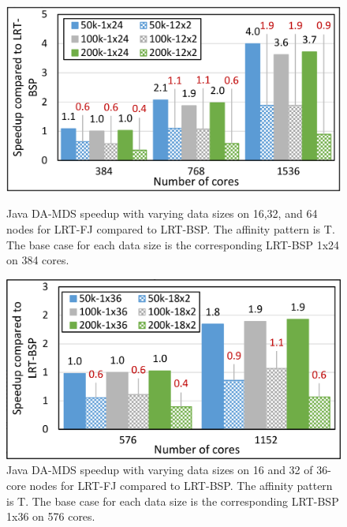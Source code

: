 \documentclass[10pt, conference, compsocconf]{IEEEtran}
\begin{document}
\begin{figure}[!htb]
	\begin{minipage}{0.49\textwidth}
        \centering
        \includegraphics[width=1\columnwidth]{images/fig_damds_LRT_FJ_speedup_compared_to_LRT_BPS_binding_pattern_T}
\caption{Java DA-MDS speedup with varying data sizes on 16,32, and 64 nodes for \ac{LRT-FJ} compared to \ac{LRT-BSP}. The affinity pattern is T. The base case for each data size is the corresponding \ac{LRT-BSP} 1x24 on 384 cores.}
\label{fig:fig_damds_LRT_FJ_speedup_compared_to_LRT_BPS_binding_pattern_T}
    \end{minipage}
    \hspace{1.4mm}
    \begin{minipage}{0.49\textwidth}
        \centering
        \includegraphics[width=1\columnwidth]{images/fig_damds_LRT_FJ_speedup_on_36core_nodes_compared_to_LRT_BPS_binding_pattern_T}
        \caption{Java DA-MDS speedup with varying data sizes on 16 and 32 of 36-core nodes for \ac{LRT-FJ} compared to \ac{LRT-BSP}. The affinity pattern is T. The base case for each data size is the corresponding \ac{LRT-BSP} 1x36 on 576 cores.}
        \label{fig:fig_damds_LRT_FJ_speedup_on_36core_nodes_compared_to_LRT_BPS_binding_pattern_T}
    \end{minipage}
\end{figure}
\end{document}

